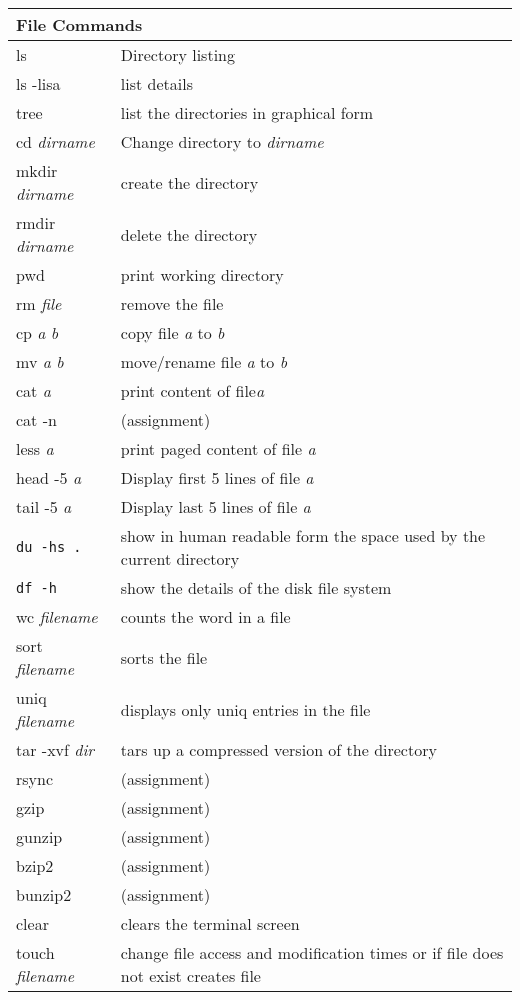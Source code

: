 \begin{center}
\begin{longtable}{|p{4cm}|p{8cm}|}
  \hline
  \multicolumn{2}{|l|}{\cellcolor{blue!15} File Commands}\\
  \hline
  ls & Directory listing\\
  ls -lisa & list details \\
  tree & list the directories in graphical form \\
  cd \emph{dirname} & Change directory to \emph{dirname} \\
  mkdir \emph{dirname} & create the directory \\
  rmdir \emph{dirname} & delete the directory \\
  pwd & print working directory \\
  rm \emph{file} & remove the file \\
  cp \emph{a} \emph{b} & copy file \emph{a} to \emph{b} \\
  mv \emph{a} \emph{b} & move/rename file \emph{a} to \emph{b}\\
  cat \emph{a} & print content of file\emph{a}\\
  cat -n &  (assignment) \\
  less \emph{a} & print paged content of file \emph{a}\\
  head -5 \emph{a} & Display first 5 lines of file \emph{a}\\
  tail -5 \emph{a} & Display last 5 lines of file \emph{a}\\
  \verb|du -hs .| & show in human readable form the space used by the current
             directory\\
  \verb|df -h| & show the details of the disk file system \\
  wc \textit{filename}&  counts the word in a file \\
  sort \textit{filename} &  sorts the file \\
  uniq \textit{filename} &  displays only uniq entries in the file \\
  tar -xvf \textit{dir} &  tars up a compressed version of the directory \\
  rsync &  (assignment) \\
  gzip &  (assignment) \\
  gunzip &  (assignment) \\
  bzip2 &  (assignment) \\
  bunzip2 &  (assignment) \\
  clear & clears the terminal screen \\
  touch \textit{filename} & change file access and modification times
  or if file does not exist creates file \\

\end{longtable}
\end{center}
